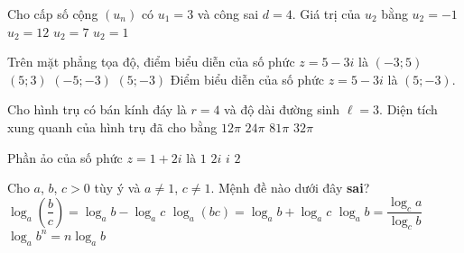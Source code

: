 \begin{ex}%
	Cho cấp số cộng $(u_n)$ có $u_1=3$ và công sai $d=4$. Giá trị của $u_2$ bằng
	\choice
	{$u_2=-1$}
	{$u_2=12$}
	{\True $u_2=7$}
	{$u_2=1$}
\end{ex}
\begin{ex}%
Trên mặt phẳng tọa độ, điểm biểu diễn của số phức $z=5-3i$ là
	\choice
	{$(-3;5)$}
	{$(5;3)$}
	{$(-5;-3)$}
	{\True $(5;-3)$}
	\loigiai
	{
		Điểm biểu diễn của số phức $z=5-3i$ là $(5;-3)$.
	}
\end{ex}
\begin{ex}%
	Cho hình trụ có bán kính đáy là $r=4$ và độ dài đường sinh $\ell =3$. Diện tích xung quanh của hình trụ đã cho bằng
	\choice
	{$12\pi$}
	{\True $24\pi$}
	{$81\pi$}
	{$32\pi$}
\end{ex}
\begin{ex}%
Phần ảo của số phức $z=1+2i$ là
	\choice
	{$1$}
	{$2i$}
	{$i$}
	{\True $2$}
\end{ex}
\begin{ex}%
		Cho $a$, $b$, $c>0$ tùy ý và $a\ne 1$, $c\ne 1$. Mệnh đề nào dưới đây \textbf{sai}?
		\choice
		{$\log_a\left(\dfrac{b}{c}\right)=\log_ab - \log_ac$}
		{$\log_a(bc)=\log_ab+\log_ac$}
		{\True $\log_ab=\dfrac{\log_ca}{\log_cb}$}
		{$\log_ab^n=n\log_ab$}
\end{ex}
